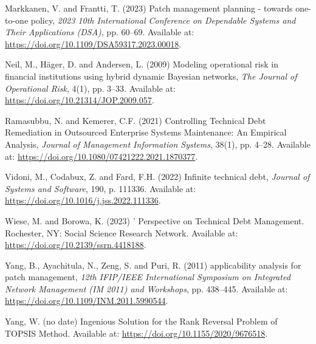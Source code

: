 \documentclass[
  british,
  12pt,
  a4paper,
]{report}
\newlength{\cslhangindent}
\newenvironment{CSLReferences}[2] %
 {\begin{list}{}{%
  \setlength{\itemindent}{0pt}
  \setlength{\leftmargin}{0pt}
  \setlength{\parsep}{0pt}
  \ifodd #1
   \setlength{\leftmargin}{\cslhangindent}
   \setlength{\itemindent}{-1\cslhangindent}
  \fi
  \setlength{\itemsep}{#2\baselineskip}}}
 {\end{list}}
\begin{document}
\begin{CSLReferences}{0}{1}
Markkanen, V. and Frantti, T. (2023) \textquotesingle Patch management
planning - towards one-to-one policy\textquotesingle, \emph{2023 10th
{International Conference} on {Dependable Systems} and {Their
Applications} ({DSA})}, pp. 60--69. Available at:
\url{https://doi.org/10.1109/DSA59317.2023.00018}.

Neil, M., Häger, D. and Andersen, L. (2009) \textquotesingle Modeling
operational risk in financial institutions using hybrid dynamic
{Bayesian} networks\textquotesingle, \emph{The Journal of Operational
Risk}, 4(1), pp. 3--33. Available at:
\url{https://doi.org/10.21314/JOP.2009.057}.

Ramasubbu, N. and Kemerer, C.F. (2021) \textquotesingle Controlling
{Technical Debt Remediation} in {Outsourced Enterprise Systems
Maintenance}: {An Empirical Analysis}\textquotesingle, \emph{Journal of
Management Information Systems}, 38(1), pp. 4--28. Available at:
\url{https://doi.org/10.1080/07421222.2021.1870377}.

Vidoni, M., Codabux, Z. and Fard, F.H. (2022) \textquotesingle Infinite
technical debt\textquotesingle, \emph{Journal of Systems and Software},
190, p. 111336. Available at:
\url{https://doi.org/10.1016/j.jss.2022.111336}.

Wiese, M. and Borowa, K. (2023) '
{Perspective} on {Technical Debt Management}\textquotesingle. Rochester,
NY: Social Science Research Network. Available at:
\url{https://doi.org/10.2139/ssrn.4418188}.

Yang, B., Ayachitula, N., Zeng, S. and Puri, R. (2011)
 applicability analysis for patch
management\textquotesingle, \emph{12th {IFIP}/{IEEE International
Symposium} on {Integrated Network Management} ({IM} 2011) and
{Workshops}}, pp. 438--445. Available at:
\url{https://doi.org/10.1109/INM.2011.5990544}.

Yang, W. (no date) \textquotesingle Ingenious {Solution} for the {Rank
Reversal Problem} of {TOPSIS Method}\textquotesingle. Available at:
\url{https://doi.org/10.1155/2020/9676518}.


\end{CSLReferences}
\end{document}
